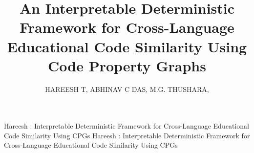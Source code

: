 \documentclass{ieeeaccess}
\begin{document}
\history{}
\doi{}
\def\volumeyear{2025}
\def\volumenumber{13}

\title{An Interpretable Deterministic Framework for Cross-Language Educational Code Similarity Using Code Property Graphs}
\author{\uppercase{Hareesh T},
\uppercase{Abhinav C Das},
\uppercase{M.G. Thushara},
}
\address[1]{Department of Computer Science and Applications, Amrita School of Computing, Amrita Vishwa Vidyapeetham, Amritapuri, India (e-mail: hareesh9320@gmail.com, abhiskp3@gmail.com,thusharamg@am.amrita.edu)}

\markboth
{Hareesh \headeretal: Interpretable Deterministic Framework for Cross-Language Educational Code Similarity Using CPGs}
{Hareesh \headeretal: Interpretable Deterministic Framework for Cross-Language Educational Code Similarity Using CPGs}

\end{document}
